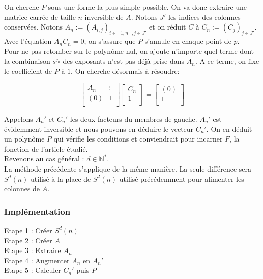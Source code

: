 \documentclass{article}
\begin{document}
	On cherche $P$ sous une forme la plus simple possible. On va donc extraire une matrice carrée de taille $n$ inversible de $A$. Notons $J'$ les indices des colonnes conservées. Notons $A_n:=(A_{i,j})_{i\in[1,n],j\in J'}$ et on réduit $C$ à $C_n:=(C_{j})_{j\in J'}$. Avec l'équation $A_n C_n = 0$, on s'assure que $P$ s'annule en chaque point de $p$.\\
	Pour ne pas retomber sur le polynôme nul, on ajoute n'importe quel terme dont la combinaison $s^{j_0}$ des exposants n'est pas déjà prise dans $A_n$. A ce terme, on fixe le coefficient de $P$ à $1$. On cherche désormais à résoudre:
	
	\begin{equation}
		\begin{bmatrix}
			A_n & \vdots \\
			(0)   & 1 \\
		\end{bmatrix} 
		\begin{bmatrix}
			C_n\\
			1\\
		\end{bmatrix} = \begin{bmatrix}
			(0)\\
			1\\
		\end{bmatrix}
	\end{equation}
	
	Appelons $A_n'$ et $C_n'$ les deux facteurs du membres de gauche. $A_n'$ est évidemment inversible et nous pouvons en déduire le vecteur $C_n'$. 
	On en déduit un polynôme $P$ qui vérifie les conditions et conviendrait pour incarner $F$, la fonction de l'article étudié.\\
	
	
	Revenons au cas général : $d\in\mathbb{N}^*$.\\
	La méthode précédente s'applique de la même manière. La seule différence sera $S^d(n)$ utilisé à la place de $S^2(n)$ utilisé précédemment pour alimenter les colonnes de $A$.

	\subsubsection{Implémentation}
	Etape 1 : Créer $S^d(n)$\\
	Etape 2 : Créer $A$\\
	Etape 3 : Extraire $A_n$\\
	Etape 4 : Augmenter $A_n$ en $A_n'$\\
	Etape 5 : Calculer $C_n'$ puis $P$\\
\end{document}
